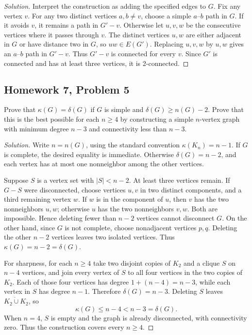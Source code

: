 \documentclass[12pt]{amsart}
\newenvironment{solution}{\begin{proof}[Solution]}{\end{proof}}
\begin{document}
    \begin{solution}

        Interpret the construction as adding the specified edges to $G$.
        Fix any vertex $v$. For any two distinct vertices $a,b\ne v$,
        choose a simple $a$--$b$ path in $G$. If it avoids $v$, it remains
        a path in $G'-v$. Otherwise let $u,v,w$ be the consecutive vertices
        where it passes through $v$. The distinct vertices $u,w$ are either
        adjacent in $G$ or have distance two in $G$, so $uw\in E(G')$.
        Replacing $u,v,w$ by $u,w$ gives an $a$--$b$ path in $G'-v$.
        Thus $G'-v$ is connected for every $v$. Since $G'$ is connected
        and has at least three vertices, it is 2-connected.
    \end{solution}

    \subsection*{Homework 7, Problem 5} Prove that $\kappa(G) = \delta(G)$ if $G$ is simple and $\delta(G) \ge n(G) - 2$.
    Prove that this is the best possible for each $n\ge 4$ by constructing a simple $n$-vertex graph with
    minimum degree $n-3$ and connectivity less than $n-3$.

    \begin{solution}

        Write $n=n(G)$, using the standard convention
        $\kappa(K_n)=n-1$. If $G$ is complete, the desired equality is
        immediate. Otherwise $\delta(G)=n-2$, and each vertex has at most
        one nonneighbor among the other vertices.

        Suppose $S$ is a vertex set with $|S|<n-2$. At least three vertices
        remain. If $G-S$ were disconnected, choose vertices $u,v$ in two
        distinct components, and a third remaining vertex $w$. If $w$ is
        in the component of $u$, then $v$ has the two nonneighbors $u,w$;
        otherwise $u$ has the two nonneighbors $v,w$. Both are impossible.
        Hence deleting fewer than $n-2$ vertices cannot disconnect $G$.
        On the other hand, since $G$ is not complete, choose nonadjacent
        vertices $p,q$. Deleting the other $n-2$ vertices leaves two isolated
        vertices. Thus $\kappa(G)=n-2=\delta(G)$.

        For sharpness, for each $n\ge4$ take two disjoint copies of $K_2$
        and a clique $S$ on $n-4$ vertices, and join every vertex of $S$
        to all four vertices in the two copies of $K_2$. Each of those four
        vertices has degree $1+(n-4)=n-3$, while each vertex in $S$ has
        degree $n-1$. Therefore $\delta(G)=n-3$. Deleting $S$ leaves
        $K_2\mathbin{\dot\cup}K_2$, so
        \[
            \kappa(G)\le n-4<n-3=\delta(G).
        \]
        When $n=4$, $S$ is empty and the graph is already disconnected,
        with connectivity zero. Thus the construction covers every $n\ge4$.
    \end{solution}
\end{document}
